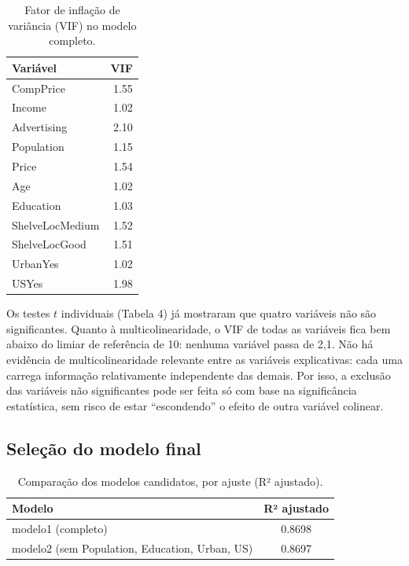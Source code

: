 \documentclass[a4paper]{modeloUFCG} %
\begin{document}
\begin{table}

\caption{\label{tab:vif}Fator de inflação de variância (VIF) no modelo completo.}
\centering
\begin{tabular}[t]{l|r}
\hline
Variável & VIF\\
\hline
CompPrice & 1.55\\
\hline
Income & 1.02\\
\hline
Advertising & 2.10\\
\hline
Population & 1.15\\
\hline
Price & 1.54\\
\hline
Age & 1.02\\
\hline
Education & 1.03\\
\hline
ShelveLocMedium & 1.52\\
\hline
ShelveLocGood & 1.51\\
\hline
UrbanYes & 1.02\\
\hline
USYes & 1.98\\
\hline
\end{tabular}
\end{table}

Os testes \(t\) individuais (Tabela 4) já mostraram que quatro variáveis não são significantes. Quanto à multicolinearidade, o VIF de todas as variáveis fica bem abaixo do limiar de referência de 10: nenhuma variável passa de 2,1. Não há evidência de multicolinearidade relevante entre as variáveis explicativas: cada uma carrega informação relativamente independente das demais. Por isso, a exclusão das variáveis não significantes pode ser feita só com base na significância estatística, sem risco de estar ``escondendo'' o efeito de outra variável colinear.

\subsection{Seleção do modelo final}\label{seleuxe7uxe3o-do-modelo-final}

\begin{table}

\caption{\label{tab:selecaoModelo}Comparação dos modelos candidatos, por ajuste (R² ajustado).}
\centering
\begin{tabular}[t]{l|c}
\hline
Modelo & R² ajustado\\
\hline
modelo1 (completo) & 0.8698\\
\hline
modelo2 (sem Population, Education, Urban, US) & 0.8697\\
\hline
\end{tabular}
\end{table}
\end{document}
